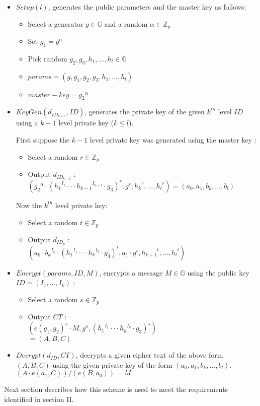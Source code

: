 \begin{itemize}
\item $Setup (l)$, generates the public parameters and the master key as follows:
\begin{itemize}
	\item Select a generator $g \in \mathbb{G}$ and a random $\alpha \in \mathbb{Z}_p$
	\item Set $g_1 = g^{\alpha}$
	\item Pick random $g_2, g_3, h_1, ..., h_l \in \mathbb{G}$
	\item $params = (g, g_1, g_2, g_3, h_1, ..., h_l)$
	\item $master-key = {g_2}^{\alpha}$\\
\end{itemize}	

\item $KeyGen(d_{{ID}_{k-1}}, ID)$, generates the private key of the given $k^{th}$ level $ID$ using a $k-1$ level private key ($k \leq l$).

First suppose the $k-1$ level private key was generated using the master key :
\begin{itemize}
	\item Select a random $r \in \mathbb{Z}_p$ 
	\item Output $d_{{ID}_{k-1}}$ : \\
	$({{g_2}^{\alpha}} \cdot {({{h_1}^{I_1}\cdot \cdot \cdot {h_{k-1}}^{I_{k-1}}} \cdot {g_3} )}^r , g^r, {h_{k}}^r, ... , {h_l}^r) = (a_0, a_1, b_k, ... , b_l)$
\end{itemize}	

Now the $k^{th}$ level private key:
\begin{itemize}
	\item Select a random $t \in \mathbb{Z}_p$ 
	\item Output $d_{{ID}_{k}}$ : \\
	$({{a_0}\cdot{{b_k}^{I_k}}} \cdot {({{h_1}^{I_1}\cdot \cdot \cdot {h_k}^{I_k}} \cdot {g_3} )}^t , {a_1}\cdot{g^t}, {h_{k+1}}^t, ... , {h_l}^t)$\\
\end{itemize}	

\item $Encrypt (params, ID, M)$, encrypts a message $M \in \mathbb{G}$ using the public key $ID = (I_1, ..., I_k)$ :

\begin{itemize}
	\item Select a random $s \in \mathbb{Z}_p$ 
	\item Output $CT$ : \\
	$(e(g_1, g_2)^s \cdot M,  g^s,  {({{h_1}^{I_1}\cdot \cdot \cdot {h_k}^{I_k}} \cdot {g_3} )}^s)$\\$=(A, B, C)$\\
\end{itemize}	


\item $Decrypt (d_{ID}, CT)$, decrypts a given cipher text of the above form $(A, B, C)$ using the given private key of the form $(a_0, a_1, b_k, ... , b_l)$. \\
$(A \cdot e(a_1, C))/(e(B, a_0)) = M$\\
\end{itemize}

Next section describes how this scheme is used to meet the requirements identified in section II.
